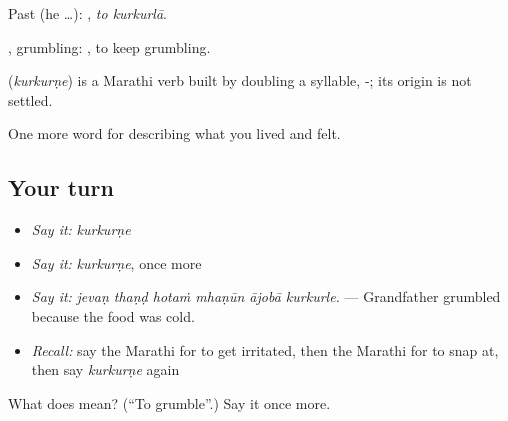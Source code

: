 Past (he …):  , \emph{to kurkurlā}.

, grumbling:  , to keep grumbling.

\begin{cousinweb}
\textbf{} (\emph{kurkurṇe}) is a Marathi verb built by doubling a syllable, -; its origin is not settled.
\end{cousinweb}

\begin{grammarlens}[title={What you've built}]
One more word for describing what you lived and felt.
\end{grammarlens}

\subsection*{Your turn}
\begin{itemize}
\raggedright
  \item \emph{Say it:} \emph{kurkurṇe}
  \item \emph{Say it:} \emph{kurkurṇe}, once more
  \item \emph{Say it:} \emph{jevaṇ thaṇḍ hotaṁ mhaṇūn ājobā kurkurle.} — Grandfather grumbled because the food was cold.
  \item \emph{Recall:} say the Marathi for to get irritated, then the Marathi for to snap at, then say \emph{kurkurṇe} again
\end{itemize}

\begin{tcolorbox}[breakable,colback=teal!4,colframe=teal!35!black,title={Before you move on}]
What does  mean? (\textquotedblleft{}To grumble\textquotedblright{}.) Say it once more.
\end{tcolorbox}
